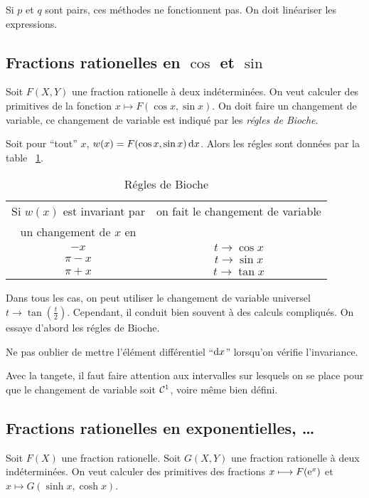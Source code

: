 Si \(p\) et \(q\) sont pairs, ces méthodes ne fonctionnent pas. On doit 
linéariser les expressions.

\subsection{Fractions rationelles en \(\cos\) et \(\sin\)}

Soit \(F(X,Y)\) une fraction rationelle à deux indéterminées. On veut calculer 
des primitives de la fonction \(x \longmapsto F(\cos x,\sin x)\). On doit faire 
un changement de variable, ce changement de variable est indiqué par les 
\emph{régles de Bioche}.

Soit pour ``tout'' \(x\), \(w(x)=F(\cos x,\sin x)\mathop{}\mathopen{}\mathrm{d} x\). Alors les régles 
sont données par la table~
\ref{tab:bioche}.
\begin{table}[!h]
  \centering
  \begin{tabular}{|c|c|}\hline
    Si \(w(x)\) est invariant par & on fait le changement de variable \\
    un changement de \(x\) en &  \\ \hline
    \(-x\) & \(t \to \cos x\)\\
    \(\pi-x\) & \(t \to \sin x\)\\
    \(\pi+x\) & \(t \to \tan x\)\\
  \hline\end{tabular}
  \caption{Régles de Bioche}
  \label{tab:bioche}
\end{table}

Dans tous les cas, on peut utiliser le changement de variable universel \(t \to 
\tan\left(\frac{t}{2}\right)\). Cependant, il conduit bien souvent à des calculs 
compliqués. On essaye d'abord les régles de Bioche.

\danger Ne pas oublier de mettre l'élément différentiel ``\(\mathop{}\mathopen{}\mathrm{d} x\)'' 
lorsqu'on vérifie l'invariance.

\danger Avec la tangete, il faut faire attention aux intervalles sur lesquels on 
se place pour que le changement de variable soit \(\mathcal{C}^{1}\), voire même bien 
défini.

\subsection{Fractions rationelles en exponentielles, \ldots}

Soit \(F(X)\) une fraction rationelle. Soit \(G(X,Y)\) une fraction rationelle à 
deux indéterminées. On veut calculer des primitives des fractions \(x 
\longmapsto F(\operatorname{e}^x)\) et \(x \longmapsto G(\sinh x,\cosh x)\).

